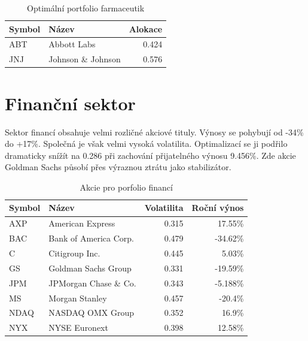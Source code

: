 \documentclass[12pt,a4paper]{report}
\begin{document}
    \begin{table}[htb]
      \centering
      \begin{tabular}{|l|l|r|}
        \hline
        Symbol&Název&Alokace\\\hline\hline
        ABT&Abbott Labs &0.424\\\hline
        JNJ&Johnson \& Johnson &0.576\\\hline
      \end{tabular}
      \caption{Optimální portfolio farmaceutik}
    \end{table}
    
  \clearpage
  \section{Finanční sektor}
    Sektor financí obsahuje velmi rozličné akciové tituly. Výnosy se pohybují od -34\% do +17\%. Společná je však velmi vysoká volatilita. Optimalizací se ji podřilo dramaticky snížít na 0.286 při zachování přijatelného výnosu 9.456\%. Zde akcie Goldman Sachs působí přes výraznou ztrátu jako stabilizátor.
    
    \begin{table}[htb]
      \centering
      \begin{tabular}{|l|l|r|r|}
        \hline
        Symbol&Název&Volatilita&Roční výnos\\\hline\hline
        AXP&American Express &0.315&17.55\%\\\hline
        BAC&Bank of America Corp. &0.479&-34.62\%\\\hline
        C&Citigroup Inc. &0.445&5.03\%\\\hline
        GS&Goldman Sachs Group &0.331&-19.59\%\\\hline
        JPM&JPMorgan Chase \& Co. &0.343&-5.188\%\\\hline
        MS&Morgan Stanley &0.457&-20.4\%\\\hline
        NDAQ&NASDAQ OMX Group &0.352&16.9\%\\\hline
        NYX&NYSE Euronext &0.398&12.58\%\\\hline
      \end{tabular}
      \caption{Akcie pro porfolio financí}
    \end{table}
\end{document}
